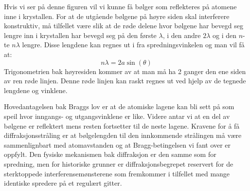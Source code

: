 \documentclass{article}
\begin{document}
Hvis vi ser på denne figuren vil vi kunne få bølger som reflekteres på atomene inne i krystallen. For at de utgående bølgene på høyre siden skal interferere konstruktiv, må tilfellet være slik at de røde delene hvor bølgene har bevegd seg lengre inn i krystallen har bevegd seg på den første $\lambda$, i den andre $2\lambda$ og i den $n$-te $n \lambda$ lengre. Disse lengdene kan regnes ut i fra spredningsvinkelen og man vil få at:
\begin{equation}
    n \lambda = 2a \sin(\theta)
\end{equation}
Trigonometrien bak høyresiden kommer av at man må ha 2 ganger den ene siden av ren røde linjen. Denne røde linjen kan raskt regnes ut ved hjelp av de tegnede lengdene og vinklene.

Hovedantagelsen bak Braggs lov er at de atomiske lagene kan bli sett på som speil hvor inngangs- og utgangsvinklene er like. Videre antar vi at en del av bølgene er reflektert mens resten fortsetter til de neste lagene.
Kravene for å få diffraksjonsstråling er at bølgelengden til den innkommende strålingen må være sammenlignbart med atomavstanden og at Bragg-betingelsen  vi fant over er oppfylt. Den fysiske mekanismen bak diffraksjon er den samme som for spredning, men for historiske grunner er diffraksjonsbegrepet reservert for de sterktoppede interferensemønsterene som fremkommer i tilfellet med mange identiske spredere på et regulært gitter.
\end{document}

